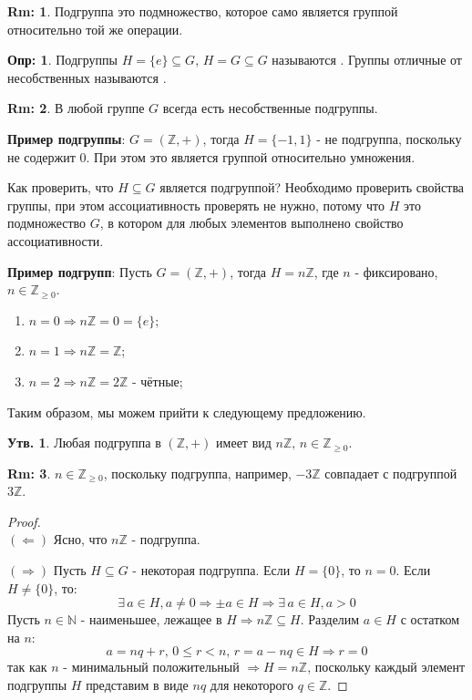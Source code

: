 \documentclass[12pt]{article}
\newcommand{\MN}{\mathbb{N}}
\newcommand{\MZ}{\mathbb{Z}}
\theoremstyle{definition}
\newtheorem{defn}{Опр:}
\newtheorem{rem}{Rm:}
\newtheorem{prop}{Утв.}
\begin{document}
\begin{rem}
	Подгруппа это подмножество, которое само является группой относительно той же операции.
\end{rem}

\begin{defn}
	Подгруппы $H = \{e\} \subseteq G, \, H = G \subseteq G$ называются . Группы отличные от несобственных называются .
\end{defn}

\begin{rem}
	В любой группе $G$ всегда есть несобственные подгруппы.
\end{rem}

\textbf{Пример подгруппы}: $G = (\MZ, +)$, тогда $H = \{-1,1\}$ - не подгруппа, поскольку не содержит $0$. При этом это является группой относительно умножения.

Как проверить, что $H \subseteq G$ является подгруппой? Необходимо проверить свойства группы, при этом ассоциативность проверять не нужно, потому что $H$ это подмножество $G$, в котором для любых элементов выполнено свойство ассоциативности.

\textbf{Пример подгрупп}: Пусть $G = (\MZ, +)$, тогда $H = n\MZ$, где $n$ - фиксировано, $n \in \MZ_{\geq 0}$.
\begin{enumerate}[label=\arabic*)]
	\item $n = 0 \Rightarrow n\MZ = 0 = \{e\}$;
	\item $n = 1 \Rightarrow n\MZ = \MZ$;
	\item $n = 2 \Rightarrow n\MZ = 2\MZ$ - чётные;
\end{enumerate}
Таким образом, мы можем прийти к следующему предложению.

\begin{prop}
	Любая подгруппа в $(\MZ,+)$ имеет вид $n\MZ, \, n \in \MZ_{\geq 0}$.
\end{prop}
\begin{rem}
	$n \in \MZ_{\geq 0}$, поскольку подгруппа, например, $-3\MZ$ совпадает с подгруппой $3\MZ$.
\end{rem}
\begin{proof}\hfill\\
	$(\Leftarrow)$ Ясно, что $n\MZ$ - подгруппа.
	
	$(\Rightarrow)$ Пусть $H \subseteq G$ - некоторая подгруппа. Если $H = \{0\}$, то $n = 0$. Если $H \neq \{0\}$, то: 
	$$
		\exists \, a\in H, a \neq 0 \Rightarrow \pm a \in H \Rightarrow \exists \, a \in H, a > 0
	$$
	Пусть $n \in \MN$ - наименьшее, лежащее в $H \Rightarrow n\MZ \subseteq H$. Разделим $a \in H$  с остатком на $n$:
	$$
		a = nq + r, \, 0 \leq r < n, \, r = a - nq \in H \Rightarrow r = 0
	$$
	так как $n$ - минимальный положительный $\Rightarrow H = n\MZ$, поскольку каждый элемент подгруппы $H$ представим в виде $nq$ для некоторого $q \in \MZ$.
\end{proof}
\end{document}
